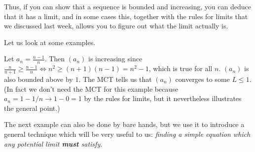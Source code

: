 \documentclass[11pt,dvipsnames]{book}
\numberwithin{equation}{section} %
\numberwithin{figure}{section} %
\numberwithin{table}{section} %
\begin{document}
\medskip
Thus, if you can show that a sequence is bounded and increasing, you can deduce that it has a limit, and in some cases this, together with the rules for limits that we discussed last week, allows you to figure out what the limit actually is.
%
%

\medskip
Let us look at some examples.
\begin{example}
Let $a_n= \frac{n-1}{n}$. Then $(a_n)$ is increasing since $\frac{n}{n+1} \geq \frac{n-1}{n} \iff n^2 \geq (n+1)(n-1) = n^2 -1$, which is true for all $n$. $(a_n)$ is also bounded above by $1$. The MCT tells us that $(a_n)$ converges to some $L \leq 1$. (In fact we don't need the MCT for this example because $ a_n = 1 - 1/n \to 1 - 0 = 1$ by the rules for limits, but it nevertheless illustrates the general point.)
\end{example}
The next example can also be done by bare hands, but we use it to introduce a general technique which will be very useful to us: {\em finding a simple equation which any potential limit {\bf must} satisfy.}
\end{document}
